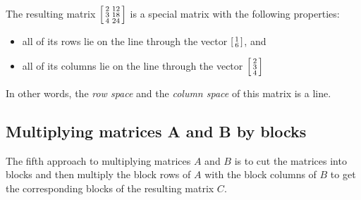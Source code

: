 \documentclass[../main.tex]{subfiles}
\begin{document}
\endgroup
The resulting matrix \(\begin{bsmallmatrix} 2 & 12 \\ 3 & 18 \\ 4 & 24 \end{bsmallmatrix}\) is a special matrix with the following properties:
\begin{itemize}
    \item all of its rows lie on the line through the vector \(\begin{bsmallmatrix} 1 \\ 6 \end{bsmallmatrix}\), and
    \item  all of its columns lie on the line through the vector \(\begin{bsmallmatrix} 2 \\ 3 \\ 4 \end{bsmallmatrix}\)
\end{itemize}
In other words, the \emph{row space} and the \emph{column space} of this matrix is a line. %


\subsection{Multiplying matrices A and B by blocks}
The fifth approach to multiplying matrices \(A\) and \(B\) is to cut the matrices into blocks and then multiply the block rows of \(A\) with the block columns of \(B\) to get the corresponding blocks of the resulting matrix \(C\).
\end{document}
